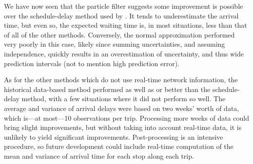 We have now seen that the particle filter suggests some improvement is possible over the schedule-delay method used by \AT. It tends to underestimate the arrival time, but even so, the expected waiting time is, in most situations, less than that of all of the other methods. Conversely, the normal approximation performed very poorly in this case, likely since summing uncertainties, and assuming independence, quickly results in an overestimation of uncertainty, and thus wide prediction intervals (not to mention high prediction error).

As for the other methods which do not use real-time network information, the historical data-based method performed as well as or better than the schedule-delay method, with a few situations where it did not perform so well. The average and variance of arrival delays were based on two weeks' worth of data, which is---at most---10 observations per trip. Processing more weeks of data could bring slight improvements, but without taking into account real-time data, it is unlikely to yield significant improvements. Post-processing is an intensive procedure, so future development could include real-time computation of the mean and variance of arrival time for each stop along each trip.
